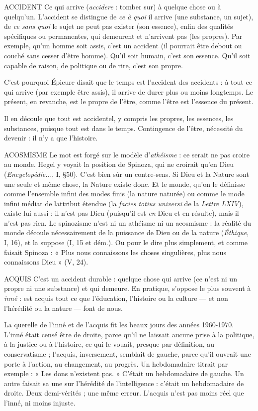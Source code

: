 ACCIDENT Ce qui arrive ({\it accidere} : tomber sur) à quelque chose ou à quelqu’un.
L'accident se distingue de {\it ce à quoi} il arrive (une substance,
un sujet), de {\it ce sans quoi} le sujet ne peut pas exister (son essence), enfin
des qualités spécifiques ou permanentes, qui demeurent et n’arrivent pas (les
propres). Par exemple, qu’un homme soit assis, c’est un accident (il pourrait
être debout ou couché sans cesser d’être homme). Qu'il soit humain, c’est
son essence. Qu'il soit capable de raison, de politique ou de rire, c’est son
propre.

C’est pourquoi Épicure disait que le temps est l'accident des accidents : à
tout ce qui arrive (par exemple être assis), il arrive de durer plus ou moins longtemps.
Le présent, en revanche, est le propre de l'être, comme l'être est
l'essence du présent.

Il en découle que tout est accidentel, y compris les propres, les essences, les
substances, puisque tout est dans le temps. Contingence de l’être, nécessité du
devenir : il n’y a que l’histoire.

ACOSMISME Le mot est forgé sur le modèle d’{\it athéisme} : ce serait ne pas
croire au monde. Hegel y voyait la position de Spinoza, qui
ne croirait qu’en Dieu ({\it Encyclopédie...}, I, \S 50). C’est bien sûr un contre-sens.
Si Dieu et la Nature sont une seule et même chose, la Nature existe
donc. Et le monde, qu’on le définisse comme l’ensemble infini des modes
finis (la nature naturée) ou comme le mode infini médiat de lattribut
étendue (la {\it facies totius universi} de la {\it Lettre LXIV}), existe lui aussi : il n’est
pas Dieu (puisqu'il est {\it en} Dieu et en résulte), mais il n’est pas rien. Le spinozisme
n’est ni un athéisme ni un acosmisme : la réalité du monde découle
nécessairement de la puissance de Dieu ou de la nature ({\it Éthique}, I, 16), et
la suppose (I, 15 et dém.). Ou pour le dire plus simplement, et comme faisait
Spinoza : « Plus nous connaissons les choses singulières, plus nous connaissons
Dieu » (V, 24).

ACQUIS C’est un accident durable : quelque chose qui arrive (ce n'est ni un
propre ni une substance) et qui demeure. En pratique, s’oppose le
plus souvent à {\it inné} : est acquis tout ce que l’éducation, l’histoire ou la culture
— et non l’hérédité ou la nature — font de nous.

La querelle de l’inné et de l’acquis fit les beaux jours des années 1960-1970.
L’inné était censé être de droite, parce qu’il ne laissait aucune prise à la politique,
à la justice ou à l’histoire, ce qui le vouait, presque par définition, au
conservatisme ; l’acquis, inversement, semblait de gauche, parce qu’il ouvrait
une porte à l’action, au changement, au progrès. Un hebdomadaire titrait par
exemple : « Les dons n’existent pas. » C'était un hebdomadaire de gauche. Un
autre faisait sa une sur l’hérédité de l'intelligence : c'était un hebdomadaire de
droite. Deux demi-vérités ; une même erreur. L’acquis n’est pas moins réel que
l’inné, ni moins injuste.

